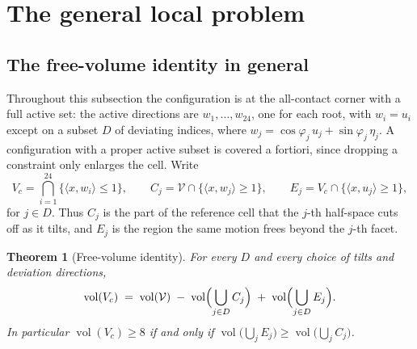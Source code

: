 \documentclass[11pt,reqno]{amsart}
\renewcommand{\_}{\origunderscore\allowbreak}
\numberwithin{equation}{section}
\theoremstyle{plain}
\newtheorem{thm}{Theorem}[section]
\theoremstyle{definition}
\theoremstyle{remark}
\newcommand{\VCell}{\mathcal{V}}             %
\newcommand{\tilt}{\varphi}                  %
\newcommand{\dev}{\eta}                      %
\newcommand{\base}{u}                        %
\DeclareMathOperator{\vol}{vol}
\begin{document}
\begin{table}[htbp]
\caption{The certificates on which proofs rest. The degree of a kernel on
pairs with a distance label is given in the angle and in the distance; a
semicolon separates the kernel on pairs from the kernel on typed triples.
The last column gives the value that the certificate proves and the value
that the theorem needs. In the first row the bound on the size of a code
is exactly $24$, as the classification needs. In the next four rows the
certificate proves a lower bound, which has to exceed the number on the
right; for \cref{thm:m23-labelled} it is the sign of every term of its
proof. In the remaining rows it proves an upper bound on $U(Y)$, which has
to lie below the number on the right.
For \cref{thm:count30,prop:C-radial} the value is the largest over the
cases of the proof.}
\label{tab:certificates}
\end{table}

\section{The general local problem}\label{sec:deviation-domain}

\subsection{The free-volume identity in general}

Throughout this subsection the configuration is at the all-contact
corner with a full active set: the active directions are
$w_1,\dots,w_{24}$, one for each root, with $w_i=\base_i$ except on a
subset $D$ of deviating indices, where $w_j=\cos\tilt_j\,\base_j+\sin\tilt_j\,\dev_j$.
A configuration with a proper active subset is covered a fortiori, since
dropping a constraint only enlarges the cell. Write
\[
  V_c=\bigcap_{i=1}^{24}\{\langle x,w_i\rangle\le1\},
  \qquad
  C_j=\VCell\cap\{\langle x,w_j\rangle\ge1\},
  \qquad
  E_j=V_c\cap\{\langle x,\base_j\rangle\ge1\},
\]
for $j\in D$. Thus $C_j$ is the part of the reference cell that the
$j$-th half-space cuts off as it tilts, and $E_j$ is the region the same
motion frees beyond the $j$-th facet.

\begin{thm}[Free-volume identity]\label{thm:freevol-new}
For every $D$ and every choice of tilts and deviation directions,
\begin{equation}\label{eq:freevol}
  \vol(V_c) \;=\; \vol(\VCell)
  \;-\;\vol\Bigl(\bigcup_{j\in D}C_j\Bigr)
  \;+\;\vol\Bigl(\bigcup_{j\in D}E_j\Bigr).
\end{equation}
In particular $\vol(V_c)\ge8$ if and only if
$\vol\bigl(\bigcup_{j}E_j\bigr)\ge\vol\bigl(\bigcup_{j}C_j\bigr)$.
\end{thm}
\end{document}
